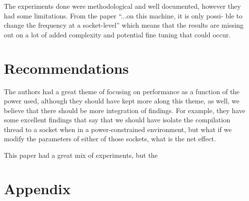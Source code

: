 \documentclass[conference]{IEEEtran}
\begin{document}
The experiments done were methodological and well documented, however they had some limitations.  From the paper ``...on this machine, it is only possi- ble to change the frequency at a socket-level'' which means that the results are missing out on a lot of added complexity and potential fine tuning that could occur.  

\section{Recommendations}
The authors had a great theme of focusing on performance as a function of the power used, although they should have kept more along this theme, as well, we believe that there should be more integration of findings.  For example, they have some excellent findings that say that we should have isolate the compilation thread to a socket when in a power-constrained environment, but what if we modify the parameters of either of those sockets, what is the net effect.

This paper had a great mix of experiments, but the 

\section{Appendix}

\end{document}
